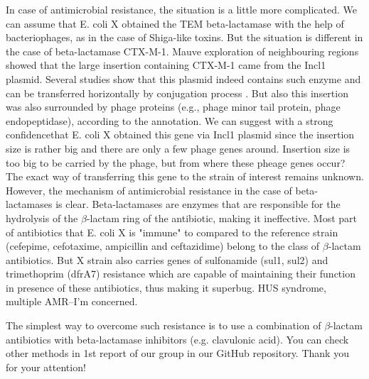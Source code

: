 \documentclass{article}
\begin{document}
In case of antimicrobial resistance, the situation is a little more complicated. We can assume that E. coli X obtained the TEM beta-lactamase with the help of bacteriophages, as in the case of Shiga-like toxins. 
But the situation is different in the case of beta-lactamase CTX-M-1. Mauve exploration of neighbouring regions showed that the large insertion containing CTX-M-1 came from the Incl1 plasmid. Several studies show that this plasmid indeed contains such enzyme and can be transferred horizontally by conjugation process \cite{nature}. But also this insertion was also surrounded by phage proteins (e.g., phage minor tail protein, phage endopeptidase), according to the annotation. We can suggest with a strong confidencethat E. coli X obtained this gene via Incl1 plasmid since the insertion size is rather big and there are only a few phage genes around. Insertion size is too big to be carried by the phage, but from where these pheage genes occur? The exact way of transferring this gene to the strain of interest remains unknown. 
However, the mechanism of antimicrobial resistance in the case of beta-lactamases is clear. Beta-lactamases are enzymes that are responsible for the hydrolysis of the $\beta$-lactam ring of the antibiotic, making it ineffective. Most part of antibiotics that E. coli X is "immune" to compared to the reference strain (cefepime, cefotaxime, ampicillin and ceftazidime) belong to the class of  $\beta$-lactam antibiotics. But X strain also carries genes of sulfonamide (sul1, sul2) and trimethoprim (dfrA7) resistance which are capable of maintaining their function in presence of these antibiotics, thus making it superbug. HUS syndrome, multiple AMR--I'm concerned.

The simplest way to overcome such resistance is to use a combination of  $\beta$-lactam antibiotics with beta-lactamase inhibitors (e.g. clavulonic acid). You can check other methods in 1st report of our group in our GitHub repository.
Thank you for your attention!
 
\end{document}
